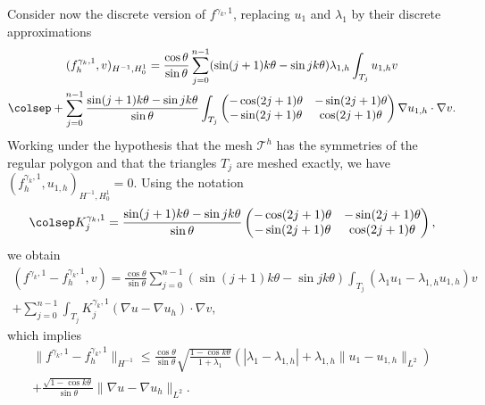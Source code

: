 Consider now the discrete version of $f^{\gamma_k,1}$, replacing $u_1$ and $\lambda_1$ by their discrete approximations
\vspace*{-5pt}
\begin{multline*}
(f_h^{\gamma_k,1},v)_{H^{-1},H_0^1} = \frac{\cos \theta}{\sin \theta}\sum_{j=0}^{n-1} (\sin(j+1)k\theta-\sin jk\theta) \lambda_{1,h} \int_{T_j} u_{1,h}v\\\colsep
+ \sum_{j=0}^{n-1} \frac{\sin(j+1)k\theta-\sin jk\theta}{\sin \theta} \int_{T_j}\begin{pmatrix}
-\cos (2j+1)\theta & -\sin (2j+1) \theta \\
-\sin (2j+1)\theta & \cos (2j+1)\theta
\end{pmatrix}\nabla u_{1,h} \cdot \nabla v.
\end{multline*}
Working under the hypothesis that the mesh $\mathcal T^h$ has the symmetries of the regular polygon and that the triangles $T_j$ are meshed exactly, we have $(f_h^{\gamma_k,1},u_{1,h})_{H^{-1},H_0^1} = 0$. Using the notation
\[\colsep
K_j^{\gamma_k,1} = \frac{\sin(j+1)k\theta-\sin jk\theta}{\sin \theta} \begin{pmatrix}
-\cos (2j+1)\theta & -\sin (2j+1) \theta \\
-\sin(2j+1)\theta & \cos (2j+1)\theta
\end{pmatrix},
\]
we obtain
\vspace*{-5pt}
\begin{multline*}
(f^{\gamma_k,1}-f^{\gamma_k,1}_h,v) = \frac{\cos \theta}{\sin \theta}\sum_{j=0}^{n-1} (\sin (j+1)k\theta-\sin jk\theta) \int_{T_j}(\lambda_1 u_1-\lambda_{1,h}u_{1,h})v\\
+ \sum_{j=0}^{n-1} \int_{T_j}K_j^{\gamma_k,1}(\nabla u - \nabla u_h)\cdot \nabla v,
\end{multline*}
which implies
\vspace*{-5pt}
\begin{multline*}
\|f^{\gamma_k,1}-f_h^{\gamma_k,1} \|_{H^{-1}} \leq \frac{\cos \theta}{\sin \theta} \sqrt{\frac{1-\cos k\theta}{1+\lambda_1}}(|\lambda_1-\lambda_{1,h}|+\lambda_{1,h}\|u_1-u_{1,h}\|_{L^2}) \\
+ \frac{\sqrt{1-\cos k\theta}}{\sin \theta} \|\nabla u-\nabla u_h\|_{L^2}.
\end{multline*}

